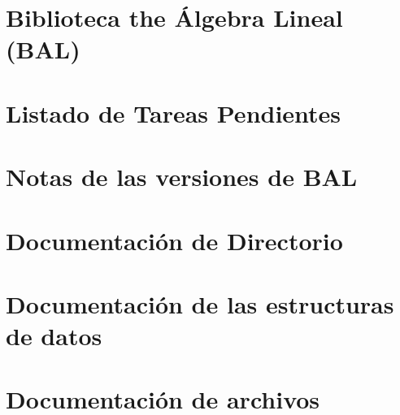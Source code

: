 \documentclass[a4paper]{article}
\begin{document}

\tableofcontents
{}
\section{Biblioteca the Álgebra Lineal (BAL) }
\label{index}\hypertarget{index}{}
\section{Listado de Tareas Pendientes}

\section{Notas de las versiones de BAL}

\section{Documentación de Directorio}



\section{Documentación de las estructuras de datos}



\section{Documentación de archivos}


















\printindex
\end{document}
